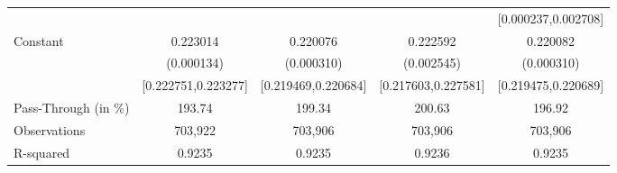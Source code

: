 {\begin{tabular}{l*{4}{c}}
                    &                     &                     &                     &[0.000237,0.002708]         \\
Constant            &    0.223014\sym{***}&    0.220076\sym{***}&    0.222592\sym{***}&    0.220082\sym{***}\\
                    &  (0.000134)         &  (0.000310)         &  (0.002545)         &  (0.000310)         \\
                    &[0.222751,0.223277]         &[0.219469,0.220684]         &[0.217603,0.227581]         &[0.219475,0.220689]         \\
\midrule
Pass-Through (in \%)&      193.74         &      199.34         &      200.63         &      196.92         \\
Observations        &     703,922         &     703,906         &     703,906         &     703,906         \\
R-squared           &      0.9235         &      0.9235         &      0.9236         &      0.9235         \\
\bottomrule
\end{tabular}
}
